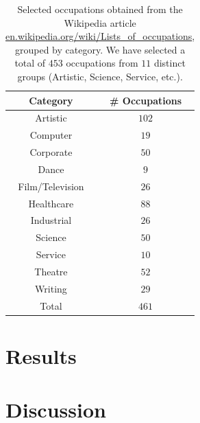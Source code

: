 \documentclass{article}
\begin{document}
\begin{table}[H]
	\centering
	\begin{tabular}{|c|c|}
	\hline
	Category 		& \# Occupations 	\\ \hline
	Artistic 		& $102$ 			\\ \hline
	Computer 		& $19$ 				\\ \hline
	Corporate 		& $50$ 				\\ \hline
	Dance 			& $9$ 				\\ \hline
	Film/Television & $26$ 				\\ \hline
	Healthcare 		& $88$ 				\\ \hline
	Industrial 		& $26$ 				\\ \hline
	Science 		& $50$ 				\\ \hline
	Service 		& $10$ 				\\ \hline
	Theatre 		& $52$ 				\\ \hline
	Writing 		& $29$ 				\\ \hline
	\hline
	Total			& $461$				\\ \hline
	\end{tabular}
	\caption{Selected occupations obtained from the Wikipedia article \url{en.wikipedia.org/wiki/Lists_of_occupations}, grouped by category. We have selected a total of $453$ occupations from $11$ distinct groups (Artistic, Science, Service, etc.).}
\end{table}

\section{Results}

\section{Discussion}



\end{document}
